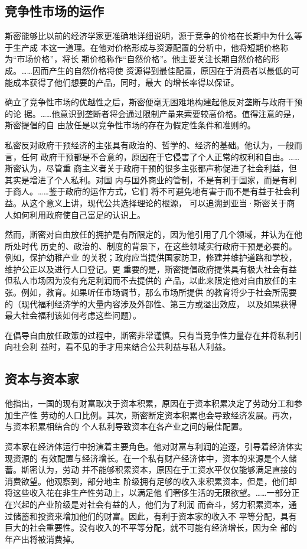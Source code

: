 \subsection{竞争性市场的运作}

斯密能够比以前的经济学家更准确地详细说明，源于竞争的价格在长期中为什么等于生产成
本这一道理。在他对价格形成与资源配置的分析中，他将短期价格称为“市场价格”，将长
期价格称作“自然价格”。他主要关注长期自然价格的形成。……因而产生的自然价格将使
资源得到最佳配置，原因在于消费者以最低的可能成本获得了他们想要的产品，同时，最大
的增长率得以保证。

确立了竞争性市场的优越性之后，斯密便毫无困难地构建起他反对垄断与政府干预的论
据。……他意识到垄断者将会通过限制产量来索要较高价格。值得注意的是，斯密提倡的自
由放任是以竞争性市场的存在为假定性条件和准则的。

私密反对政府干预经济的主张具有政治的、哲学的、经济的基础。他认为，一般而言，任何
政府干预都是不合意的，原因在于它侵害了个人正常的权利和自由。……斯密认为，尽管重
商主义者关于政府干预的很多主张都声称促进了社会利益，但其实是增进了个人私利。对国
内与国外商业的管制，不是有利于国家，而是有利于商人。……鉴于政府的运作方式，它们
将不可避免地有害于而不是有益于社会利益。从这个意义上讲，现代公共选择理论的根源，
可以追溯到亚当·斯密关于商人如何利用政府使自己富足的认识上。

然而，斯密对自由放任的拥护是有所限定的，因为他引用了几个领域，并认为在他所处时代
历史的、政治的、制度的背景下，在这些领域实行政府干预是必要的。例如，保护幼稚产业
的关税；政府应当提供国家防卫，修建并维护道路和学校，维护公正以及进行人口登记。更
重要的是，斯密提倡政府提供具有极大社会有益但私人市场因为没有充足利润而不去提供的
产品，以此来限定他对自由放任的主张。例如，教育。如果听任市场调节，那么市场所提供
的教育将少于社会所需要的（现代福利经济学的大量内容涉及外部性、第三方或溢出效应，
以及如果获得最大社会福利该如何考虑这些问题）。

在倡导自由放任政策的过程中，斯密非常谨慎。只有当竞争性力量存在并将私利引向社会利
益时，看不见的手才用来结合公共利益与私人利益。

\subsection{资本与资本家}

他指出，一国的现有财富取决于资本积累，原因在于资本积累决定了劳动分工和参加生产性
劳动的人口比例。其次，斯密断定资本积累也会导致经济发展。再次，与资本积累相结合的
个人私利导致资本在各产业之间的最佳配置。

资本家在经济体运行中扮演着主要角色。他对财富与利润的追逐，引导着经济体实现资源的
有效配置与经济增长。在一个私有财产经济体中，资本的来源是个人储蓄。斯密认为，劳动
并不能够积累资本，原因在于工资水平仅仅能够满足直接的消费欲望。他观察到，部分地主
阶级拥有足够的收入来积累资本，但是，他们却将这些收入花在非生产性劳动上，以满足他
们奢侈生活的无限欲望。……一部分正在兴起的产业阶级是对社会有益的人，他们为了利润
而奋斗，努力积累资本，通过储蓄和投资来增加他们的财富。因此，有利于资本家的收入不
平等分配，具有巨大的社会重要性。没有收入的不平等分配，就不可能有经济增长，因为全
部的年产出将被消费掉。

